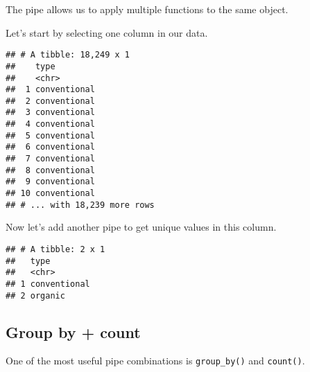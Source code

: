 \documentclass[]{book}
\newenvironment{Shaded}{\begin{snugshade}}{\end{snugshade}}
\newcommand{\KeywordTok}[1]{\textcolor[rgb]{0.13,0.29,0.53}{\textbf{#1}}}
\newcommand{\NormalTok}[1]{#1}
\newcommand{\OperatorTok}[1]{\textcolor[rgb]{0.81,0.36,0.00}{\textbf{#1}}}
\newcommand{\StringTok}[1]{\textcolor[rgb]{0.31,0.60,0.02}{#1}}
\begin{document}
The pipe allows us to apply multiple functions to the same object.

Let's start by selecting one column in our data.

\begin{Shaded}
\end{Shaded}

\begin{verbatim}
## # A tibble: 18,249 x 1
##    type        
##    <chr>       
##  1 conventional
##  2 conventional
##  3 conventional
##  4 conventional
##  5 conventional
##  6 conventional
##  7 conventional
##  8 conventional
##  9 conventional
## 10 conventional
## # ... with 18,239 more rows
\end{verbatim}

Now let's add another pipe to get unique values in this column.

\begin{Shaded}
\end{Shaded}

\begin{verbatim}
## # A tibble: 2 x 1
##   type        
##   <chr>       
## 1 conventional
## 2 organic
\end{verbatim}

\hypertarget{group-by-count}{%
\subsection{Group by + count}\label{group-by-count}}

One of the most useful pipe combinations is \texttt{group\_by()} and \texttt{count()}.

\begin{Shaded}
\end{Shaded}
\end{document}

